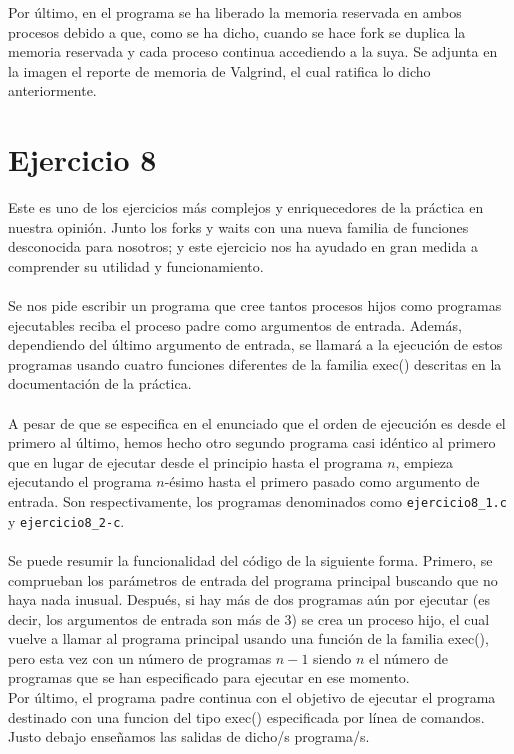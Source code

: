\documentclass[12pt]{article}
\begin{document}
Por último, en el programa se ha liberado la memoria reservada en ambos procesos debido a que, como se ha dicho, cuando se hace fork se duplica la memoria reservada y cada proceso continua accediendo a la suya. Se adjunta en la imagen el reporte de memoria de Valgrind, el cual ratifica lo dicho anteriormente.\\


\section{Ejercicio 8}
Este es uno de los ejercicios más complejos y enriquecedores de la práctica en nuestra opinión. Junto los forks y waits con una nueva familia de funciones desconocida para nosotros; y este ejercicio nos ha ayudado en gran medida a comprender su utilidad y funcionamiento.\\\\
Se nos pide escribir un programa que cree tantos procesos hijos como programas ejecutables reciba el proceso padre como argumentos de entrada. Además, dependiendo del último argumento de entrada, se llamará a la ejecución de estos programas usando cuatro funciones diferentes de la familia exec() descritas en la documentación de la práctica.\\\\
A pesar de que se especifica en el enunciado que el orden de ejecución es desde el primero al último, hemos hecho otro segundo programa casi idéntico al primero que en lugar de ejecutar desde el principio hasta el programa $n$, empieza ejecutando el programa $n$-ésimo hasta el primero pasado como argumento de entrada. Son respectivamente, los programas denominados como \texttt{ejercicio8\_1.c} y \texttt{ejercicio8\_2-c}. \\\\
Se puede resumir la funcionalidad del código de la siguiente forma. Primero, se comprueban los parámetros de entrada del programa principal buscando que no haya nada inusual. Después, si hay más de dos programas aún por ejecutar (es decir, los argumentos de entrada son más de 3) se crea un proceso hijo, el cual vuelve a llamar al programa principal usando una función de la familia exec(), pero esta vez con un número de programas $n-1$ siendo $n$ el número de programas que se han especificado para ejecutar en ese momento.\\ Por último, el programa padre continua con el objetivo de ejecutar el programa destinado con una funcion del tipo exec() especificada por línea de comandos.\\Justo debajo enseñamos las salidas de dicho/s programa/s.\\\\
\end{document}
